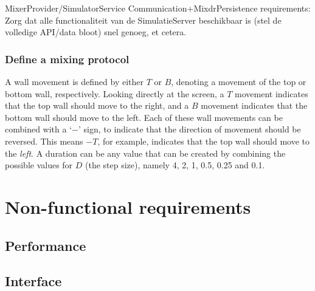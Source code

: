MixerProvider/SimulatorService Communication+MixdrPersistence requirements:
Zorg dat alle functionaliteit van de SimulatieServer beschikbaar is (stel de volledige API/data bloot)
snel genoeg, et cetera.


\subsubsection{Define a mixing protocol}
A wall movement is defined by either $T$ or $B$, denoting a movement of the top or bottom wall, respectively. Looking directly at the screen, a $T$ movement indicates that the top wall should move to the right, and a $B$ movement indicates that the bottom wall should move to the left. Each of these wall movements can be combined with a `$-$' sign, to indicate that the direction of movement should be reversed. This means $-T$, for example, indicates that the top wall should move to the \emph{left}. A duration can be any value that can be created by combining the possible values for $D$ (the step size), namely 4, 2, 1, 0.5, 0.25 and 0.1.

\section{Non-functional requirements}
\label{sec:nonfuncreq}

\subsection{Performance}



\subsection{Interface}

